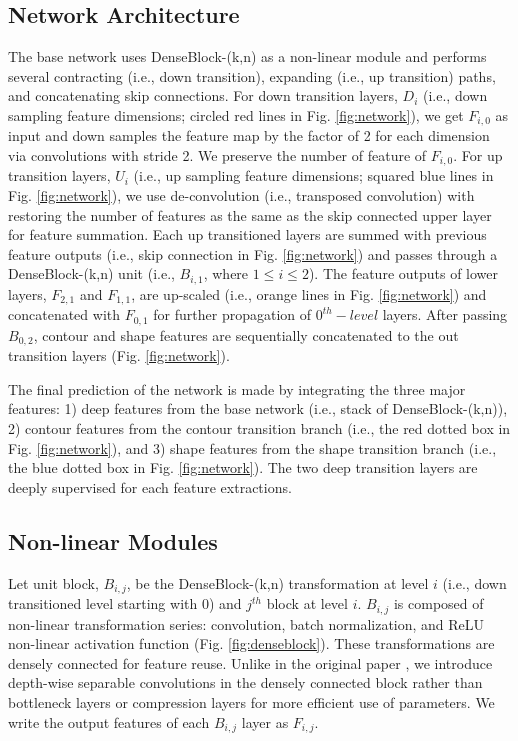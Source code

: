 \documentclass[journal]{IEEEtran}
\begin{document}
\subsection{Network Architecture}
The base network uses DenseBlock-(k,n) as a non-linear module and performs several contracting (i.e., down transition), expanding (i.e., up transition) paths, and concatenating skip connections. For down transition layers, \(D_i\) (i.e., down sampling feature dimensions; circled red lines in Fig. \ref{fig:network}), we get \(F_{i,0}\) as input and down samples the feature map by the factor of 2 for each dimension via convolutions with stride 2. We preserve the number of feature of \(F_{i,0}\). For up transition layers, \(U_i\) (i.e., up sampling feature dimensions; squared blue lines in Fig. \ref{fig:network}), we use de-convolution (i.e., transposed convolution) with restoring the number of features as the same as the skip connected upper layer for feature summation. Each up transitioned layers are summed with previous feature outputs (i.e., skip connection in Fig. \ref{fig:network}) and passes through a DenseBlock-(k,n) unit (i.e., \(B_{i,1}\), where \(1\leq i\leq2\)). The feature outputs of lower layers, \(F_{2,1}\) and \(F_{1,1}\), are up-scaled (i.e., orange lines in Fig. \ref{fig:network}) and concatenated with \(F_{0,1}\) for further propagation of \(0^{th}-level\) layers. After passing \(B_{0,2}\), contour and shape features are sequentially concatenated to the out transition layers (Fig. \ref{fig:network}).\par
The final prediction of the network is made by integrating the three major features: 1) deep features from the base network (i.e., stack of DenseBlock-(k,n)), 2) contour features from the contour transition branch (i.e., the red dotted box in Fig. \ref{fig:network}), and 3) shape features from the shape transition branch (i.e., the blue dotted box in Fig. \ref{fig:network}). The two deep transition layers are deeply supervised for each feature extractions.

\subsection{Non-linear Modules}
Let unit block, \(B_{i,j}\), be the DenseBlock-(k,n) transformation at level \(i\) (i.e., down transitioned level starting with \(0\)) and \(j^{th}\) block at level \(i\). \(B_{i,j}\) is composed of non-linear transformation series: convolution, batch normalization, and ReLU non-linear activation function (Fig. \ref{fig:denseblock}). These transformations are densely connected for feature reuse. Unlike in the original paper \cite{huang2017densely}, we introduce depth-wise separable convolutions \cite{chollet2017xception} in the densely connected block rather than bottleneck layers \cite{szegedy2016rethinking} or compression layers \cite{huang2017densely} for more efficient use of parameters. We write the output features of each \(B_{i,j}\) layer as \(F_{i,j}\).\par
\end{document}
